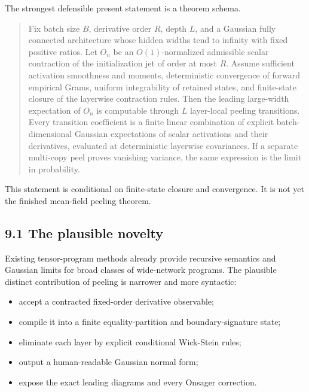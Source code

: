 The strongest defensible present statement is a theorem schema.

\begin{quote}\itshape

Fix batch size \(B\), derivative order \(R\), depth \(L\), and a Gaussian
fully connected architecture whose hidden widths tend to infinity with
fixed positive ratios. Let \(O_n\) be an \(O(1)\)-normalized admissible
scalar contraction of the initialization jet of order at most \(R\).
Assume sufficient activation smoothness and moments, deterministic
convergence of forward empirical Grams, uniform integrability of retained
states, and finite-state closure of the layerwise contraction rules. Then
the leading large-width expectation of \(O_n\) is computable through
\(L\) layer-local peeling transitions. Every transition coefficient is a
finite linear combination of explicit batch-dimensional Gaussian
expectations of scalar activations and their derivatives, evaluated at
deterministic layerwise covariances. If a separate multi-copy peel proves
vanishing variance, the same expression is the limit in probability.
\end{quote}


This statement is conditional on finite-state closure and convergence. It is
not yet the finished mean-field peeling theorem.

\subsection*{9.1 The plausible novelty}


Existing tensor-program methods already provide recursive semantics and
Gaussian limits for broad classes of wide-network programs. The plausible
distinct contribution of peeling is narrower and more syntactic:

\begin{itemize}
\item accept a contracted fixed-order derivative observable;
\item compile it into a finite equality-partition and boundary-signature state;
\item eliminate each layer by explicit conditional Wick-Stein rules;
\item output a human-readable Gaussian normal form;
\item expose the exact leading diagrams and every Onsager correction.
\end{itemize}


